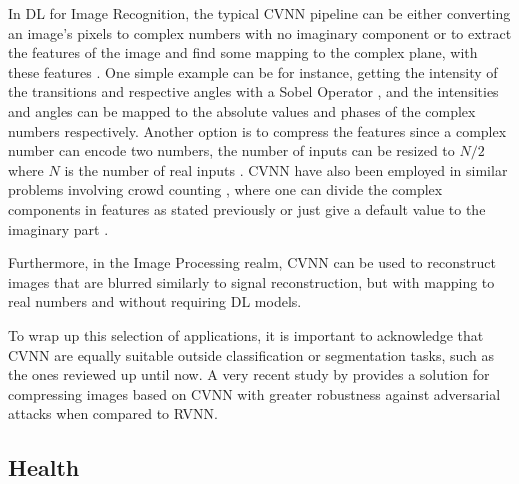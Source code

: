 In \gls{DL} for Image Recognition, the typical \gls{CVNN} pipeline can be either converting an image's pixels to complex numbers with no imaginary component or to extract the features of the image and find some mapping to the complex plane, with these features \parencite{gu2018convcvnnvgg, chiheb2017deep}. One simple example can be for instance, getting the intensity of the transitions and respective angles with a Sobel Operator \parencite{sobel2014operator}, and the intensities and angles can be mapped to the absolute values and phases of the complex numbers respectively. Another option is to compress the features since a complex number can encode two numbers, the number of inputs can be resized to $ N/2 $ where $ N $ is the number of real inputs \parencite{gu2018convcvnnvgg}. \gls{CVNN} have also been employed in similar problems involving crowd counting \parencite{matlacz2018crowd}, where one can divide the complex components in features as stated previously or just give a default value to the imaginary part \parencite{chiheb2017deep, matlacz2018crowd}.

Furthermore, in the Image Processing realm, \gls{CVNN} can be used to reconstruct images that are blurred \parencite{aizenberg2008blurdetect, aizenberg2011blurbetter} similarly to signal reconstruction, but with mapping to real numbers and without requiring \gls{DL} models.

To wrap up this selection of applications, it is important to acknowledge that \gls{CVNN} are equally suitable outside classification or segmentation tasks, such as the ones reviewed up until now. A very recent study by \textcite{luo2024imagecompressalgocvnn} provides a solution for compressing images based on \gls{CVNN} with greater robustness against adversarial attacks when compared to \gls{RVNN}.

\subsection{Health}

